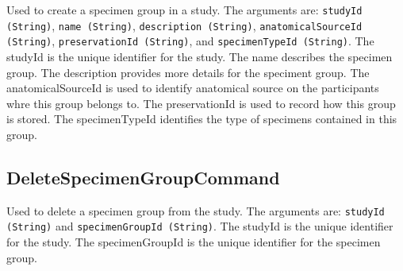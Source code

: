 Used to create a specimen group in a study. The arguments are: \texttt{studyId
  (String)}, \texttt{name (String)}, \texttt{description (String)},
\texttt{anatomicalSourceId (String)}, \texttt{preservationId (String)}, and
\texttt{specimenTypeId (String)}. The studyId is the unique identifier for the
study. The name describes the specimen group. The description provides more
details for the speciment group.  The anatomicalSourceId is used to identify
anatomical source on the participants whre this group belongs to.  The
preservationId is used to record how this group is stored.  The specimenTypeId
identifies the type of specimens contained in this group.

\subsection*{DeleteSpecimenGroupCommand}

Used to delete a specimen group from the study. The arguments are:
\texttt{studyId (String)} and \texttt{specimenGroupId (String)}. The studyId is
the unique identifier for the study. The specimenGroupId is the unique
identifier for the specimen group.


